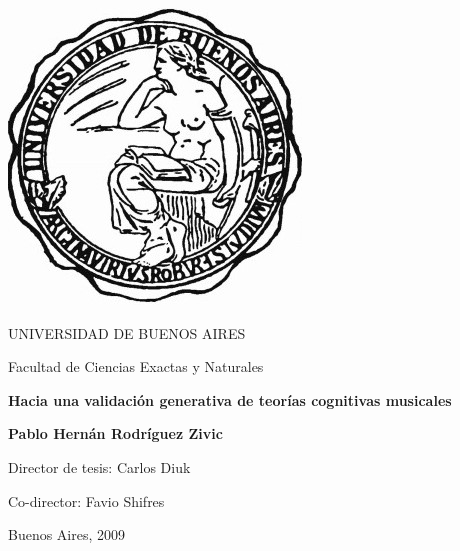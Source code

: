 \thispagestyle{empty}

\begin {center}

\includegraphics[scale=.3]{uba2.jpg}

\medskip
UNIVERSIDAD DE BUENOS AIRES

Facultad de Ciencias Exactas y Naturales


\vspace{3cm}


\textbf{\Large Hacia una validaci\'on generativa de teor\'ias cognitivas musicales}

\vspace{2cm}



\vspace{2cm}

\textbf{Pablo Hern\'an Rodr\'iguez Zivic}

\end {center}


\vspace{1.5cm}

\noindent Director de tesis: Carlos Diuk

\noindent Co-director: Favio Shifres 


\vspace{1cm}

\vspace{1cm}

\noindent Buenos Aires, 2009


